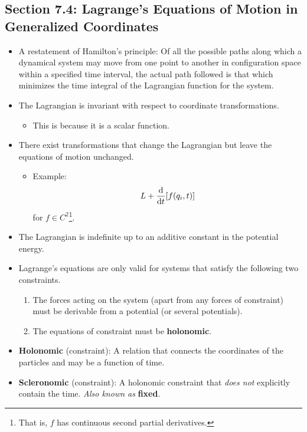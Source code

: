 \documentclass[../notes.tex]{subfiles}
\begin{document}
\subsection*{Section 7.4: Lagrange's Equations of Motion in Generalized Coordinates}
\begin{itemize}
    \item A restatement of Hamilton's principle: Of all the possible paths along which a dynamical system may move from one point to another in configuration space within a specified time interval, the actual path followed is that which minimizes the time integral of the Lagrangian function for the system.
    \item The Lagrangian is invariant with respect to coordinate transformations.
    \begin{itemize}
        \item This is because it is a scalar function.
    \end{itemize}
    \item There exist transformations that change the Lagrangian but leave the equations of motion unchanged.
    \begin{itemize}
        \item Example:
        \begin{equation*}
            L+\dv{t}[f(q_i,t)]
        \end{equation*}
        for $f\in C^2$\footnote{That is, $f$ has continuous second partial derivatives.}.
    \end{itemize}
    \item The Lagrangian is indefinite up to an additive constant in the potential energy.
    \item Lagrange's equations are only valid for systems that satisfy the following two constraints.
    \begin{enumerate}
        \item The forces acting on the system (apart from any forces of constraint) must be derivable from a potential (or several potentials).
        \item The equations of constraint must be \textbf{holonomic}.
    \end{enumerate}
    \item \textbf{Holonomic} (constraint): A relation that connects the coordinates of the particles and may be a function of time.
    \item \textbf{Scleronomic} (constraint): A holonomic constraint that \emph{does not} explicitly contain the time. \emph{Also known as} \textbf{fixed}.

\end{itemize}
\end{document}
